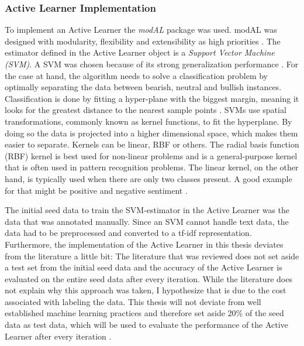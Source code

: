 \documentclass[11pt, a4paper]{article}
\begin{document}
\subsubsection{Active Learner Implementation}
To implement an Active Learner the \emph{modAL} package was used. modAL was designed with modularity, flexibility and extensibility as high priorities \citep{danka2018modal}. 
The estimator defined in the Active Learner object is a \emph{Support Vector Machine (SVM)}. A SVM was chosen because of its strong generalization 
performance \citep{alves2014comparisonsvm}.
For the case at hand, the algorithm needs to solve a classification problem by optimally separating the data between bearish, 
neutral and bullish instances. Classification is done by fitting a hyper-plane with the biggest margin, meaning it looks for the greatest distance 
to the nearest sample points \citep{jemai2021SentimentAnalysis}. SVMs use spatial transformations, commonly known as kernel functions, to fit the hyperplane.
By doing so the data is projected into a higher dimensional space, which makes them easier to separate.
Kernels can be linear, RBF or others. The radial basis function (RBF) kernel is best used for non-linear problems and is a general-purpose kernel that 
is often used in pattern recognition problems. The linear kernel, on the other hand, is typically used when there are only two classes present. 
A good example for that might be positive and negative sentiment \citep{alves2014comparisonsvm}.

The initial seed data to train the SVM-estimator in the Active Learner was the data that was annotated manually.
Since an SVM cannot handle text data, the data had to be preprocessed and converted to a tf-idf representation. %
Furthermore, the implementation of the Active Learner in this thesis deviates from the literature a little bit: The literature that was reviewed
does not set aside a test set from the initial seed data and the accuracy of the Active Learner is evaluated on the entire seed data after every iteration. 
While the literature does not explain why this approach was
taken, I hypothesize that is due to the cost associated with labeling the data. This thesis will not deviate from well established machine learning practices
and therefore set aside 20\% of the seed data as test data, which will be used to evaluate the performance of the Active Learner after every iteration \cite[p. 196]{raschka2019pythonmachinelearning}.
\end{document}
